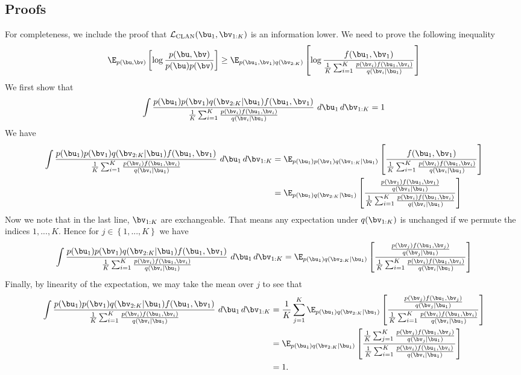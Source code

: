 \subsection{Proofs}
For completeness, we include the proof that $\mathcal{L}_\text{CLAN}(\bu_1, \bv_{1:K})$ is an information lower. We need to prove the following inequality
\begin{equation}
	\E_{p(\bu,\bv)}\left[\log \frac{p(\bu,\bv)}{p(\bu)p(\bv)} \right] \ge \E_{p(\bu_1,\bv_1)q(\bv_{2:K})}\left[\log \frac{f(\bu_1,\bv_1)}{\frac{1}{K}\sum_{i=1}^K \frac{p(\bv_i)f(\bu_1,\bv_i)}{q(\bv_i|\bu_1)}} \right]
\end{equation}
We first show that 
\begin{equation}
	\int \frac{p(\bu_1)p(\bv_1)q(\bv_{2:K}|\bu_1)f(\bu_1,\bv_1)}{\frac{1}{K}\sum_{i=1}^K \frac{p(\bv_i)f(\bu_1,\bv_i)}{q(\bv_i|\bu_1)}} \ d\bu_1\,d\bv_{1:K} = 1
\end{equation}
We have
\begin{align}
\int \frac{p(\bu_1)p(\bv_1)q(\bv_{2:K}|\bu_1)f(\bu_1,\bv_1)}{\frac{1}{K}\sum_{i=1}^K \frac{p(\bv_i)f(\bu_1,\bv_i)}{q(\bv_i|\bu_1)}} \ d\bu_1\,d\bv_{1:K} &= \E_{p(\bu_1)p(\bv_1)q(\bv_{1:K}|\bu_1)}\left[ \frac{f(\bu_1,\bv_1)}{\frac{1}{K}\sum_{i=1}^K \frac{p(\bv_i)f(\bu_1,\bv_i)}{q(\bv_i|\bu_1)}} \right] \\
&= \E_{p(\bu_1)q(\bv_{2:K}|\bu_1)}\left[ \frac{\frac{p(\bv_1)f(\bu_1,\bv_1)}{q(\bv_1|\bu_1)}}{\frac{1}{K}\sum_{i=1}^K \frac{p(\bv_i)f(\bu_1,\bv_i)}{q(\bv_i|\bu_1)}} \right]
\end{align}
Now we note that in the last line, $\bv_{1:K}$ are exchangeable. That means any expectation under $q(\bv_{1:K})$ is unchanged if we permute the indices $1, ..., K$. Hence for $j \in \left\{1, ..., K \right\}$ we have
\begin{equation}
	\int \frac{p(\bu_1)p(\bv_1)q(\bv_{2:K}|\bu_1)f(\bu_1,\bv_1)}{\frac{1}{K}\sum_{i=1}^K \frac{p(\bv_i)f(\bu_1,\bv_i)}{q(\bv_i|\bu_1)}} \ d\bu_1\,d\bv_{1:K} = \E_{p(\bu_1)q(\bv_{2:K}|\bu_1)}\left[ \frac{\frac{p(\bv_j)f(\bu_1,\bv_j)}{q(\bv_j|\bu_1)}}{\frac{1}{K}\sum_{i=1}^K \frac{p(\bv_i)f(\bu_1,\bv_i)}{q(\bv_i|\bu_1)}} \right]
\end{equation}
Finally, by linearity of the expectation, we may take the mean over $j$ to see that
\begin{align}
\int \frac{p(\bu_1)p(\bv_1)q(\bv_{2:K}|\bu_1)f(\bu_1,\bv_1)}{\frac{1}{K}\sum_{i=1}^K \frac{p(\bv_i)f(\bu_1,\bv_i)}{q(\bv_i|\bu_1)}} \ d\bu_1\,d\bv_{1:K} &= \frac{1}{K}\sum_{j=1}^K\E_{p(\bu_1)q(\bv_{2:K}|\bu_1)}\left[ \frac{\frac{p(\bv_j)f(\bu_1,\bv_j)}{q(\bv_j|\bu_1)}}{\frac{1}{K}\sum_{i=1}^K \frac{p(\bv_i)f(\bu_1,\bv_i)}{q(\bv_i|\bu_1)}} \right] \\
&=\E_{p(\bu_1)q(\bv_{2:K}|\bu_1)}\left[ \frac{\frac{1}{K}\sum_{j=1}^K\frac{p(\bv_j)f(\bu_1,\bv_j)}{q(\bv_j|\bu_1)}}{\frac{1}{K}\sum_{i=1}^K \frac{p(\bv_i)f(\bu_1,\bv_i)}{q(\bv_i|\bu_1)}} \right] \\
&= 1.
\end{align}
